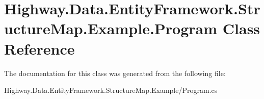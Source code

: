 \hypertarget{class_highway_1_1_data_1_1_entity_framework_1_1_structure_map_1_1_example_1_1_program}{\section{Highway.\-Data.\-Entity\-Framework.\-Structure\-Map.\-Example.\-Program Class Reference}
\label{class_highway_1_1_data_1_1_entity_framework_1_1_structure_map_1_1_example_1_1_program}
}


The documentation for this class was generated from the following file\-:\begin{DoxyCompactItemize}
\item 
Highway.\-Data.\-Entity\-Framework.\-Structure\-Map.\-Example/Program.\-cs\end{DoxyCompactItemize}
